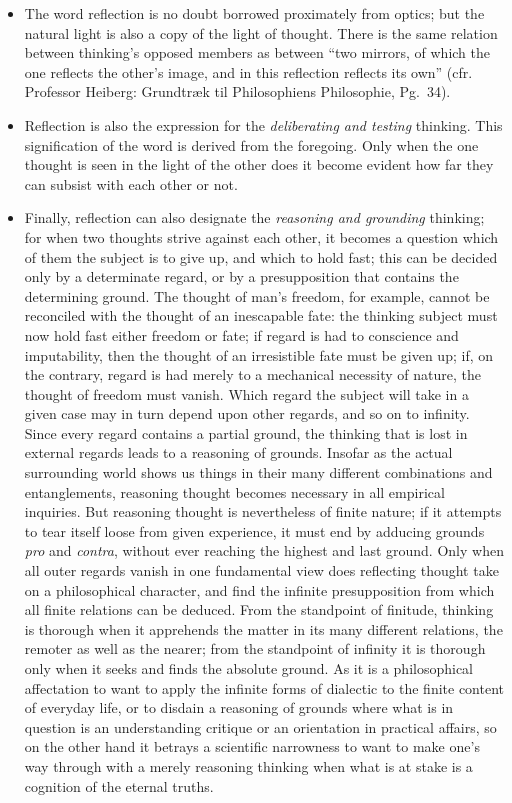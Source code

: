 \documentclass[12pt]{book}
\begin{document}
\begin{itemize}
\item[a)] The word reflection is no doubt borrowed proximately from optics;
  but the natural light is also a copy of the light of thought. There is the
  same relation between thinking's opposed members as between ``two mirrors,
  of which the one reflects the other's image, and in this reflection
  reflects its own'' (cfr. Professor Heiberg: Grundtræk til Philosophiens
  Philosophie, Pg.\ 34).
\item[b)] Reflection is also the expression for the \emph{deliberating and
  testing} thinking. This signification of the word is derived from the
  foregoing. Only when the one thought is seen in the light of the other
  does it become evident how far they can subsist with each other or not.
\item[c)] Finally, reflection can also designate the \emph{reasoning and
  grounding} thinking; for when two thoughts strive against each other, it
  becomes a question which of them the subject is to give up, and which to
  hold fast; this can be decided only by a determinate regard, or by a
  presupposition that contains the determining ground. The thought of man's
  freedom, for example, cannot be reconciled with the thought of an
  inescapable fate: the thinking subject must now hold fast either freedom
  or fate; if regard is had to conscience and imputability, then the thought
  of an irresistible fate must be given up; if, on the contrary, regard is
  had merely to a mechanical necessity of nature, the thought of freedom
  must vanish. Which regard the subject will take in a given case may in
  turn depend upon other regards, and so on to infinity. Since every regard
  contains a partial ground, the thinking that is lost in external regards
  leads to a reasoning of grounds. Insofar as the actual surrounding world
  shows us things in their many different combinations and entanglements,
  reasoning thought becomes necessary in all empirical inquiries. But
  reasoning thought is nevertheless of finite nature; if it attempts to tear
  itself loose from given experience, it must end by adducing grounds
  \textit{pro} and \textit{contra}, without ever reaching the highest and
  last ground. Only when all outer regards vanish in one fundamental view
  does reflecting thought take on a philosophical character, and find the
  infinite presupposition from which all finite relations can be deduced.
  From the standpoint of finitude, thinking is thorough when it apprehends
  the matter in its many different relations, the remoter as well as the
  nearer; from the standpoint of infinity it is thorough only when it seeks
  and finds the absolute ground. As it is a philosophical affectation to
  want to apply the infinite forms of dialectic to the finite content of
  everyday life, or to disdain a reasoning of grounds where what is in
  question is an understanding critique or an orientation in practical
  affairs, so on the other hand it betrays a scientific narrowness to want
  to make one's way through with a merely reasoning thinking when what is at
  stake is a cognition of the eternal truths.
\end{itemize}
\end{document}
